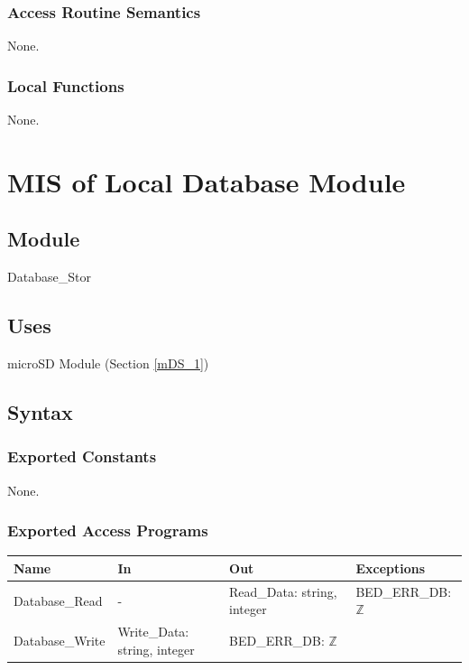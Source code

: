 \documentclass[12pt, titlepage]{article}
\begin{document}
\subsubsection{Access Routine Semantics}

None.

\subsubsection{Local Functions}

None.

\newpage

\section{MIS of Local Database Module} \label{mDS_2} 

\subsection{Module}

Database\_Stor

\subsection{Uses}

microSD Module (Section \ref{mDS_1})   %

\subsection{Syntax}

\subsubsection{Exported Constants}

None.

\subsubsection{Exported Access Programs}

\begin{center}
\begin{tabular}{p{4cm} p{4cm} p{3.5cm} p{3.6cm}}
\hline
\textbf{Name} & \textbf{In} & \textbf{Out} & \textbf{Exceptions} \\
\hline
Database\_Read & - & Read\_Data: string, integer & BED\_ERR\_DB: $\mathbb{Z}$ \\
Database\_Write & Write\_Data: string, integer & BED\_ERR\_DB: $\mathbb{Z}$ \\
\hline
\end{tabular}
\end{center}
\end{document}
